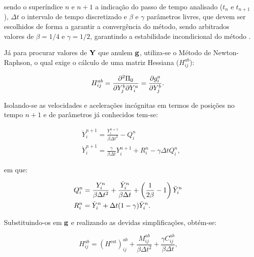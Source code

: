\documentclass[_ArquivoPrincipal.tex]{subfiles}
\begin{document}
\noindent sendo o superíndice $n$ e $n+1$ a indicação do passo de tempo analisado ($t_n$ e $t_{n+1}$), $\Delta t$ o intervalo de tempo discretizado e $\beta$ e $\gamma$ parâmetros livres, que devem ser escolhidos de forma a garantir a convergência do método, sendo arbitrados valores de $\beta=1/4$ e $\gamma=1/2$, garantindo a estabilidade incondicional do método \cite{LINDFIELD2019239}.

Já para procurar valores de $\mathbf{Y}$ que anulem $\mathbf{g}$, utiliza-se o Método de Newton-Raphson, o qual exige o cálculo de uma matriz Hessiana ($H_{ij}^{ab}$):

\begin{equation}
    H_{ij}^{ab}=\frac{\partial^2\Pi_0}{\partial Y_j^b\partial Y_i^a}=\frac{\partial{g_i^a}}{\partial{Y_j^b}}\text{.}
\end{equation}

Isolando-se as velocidades e acelerações incógnitas em termos de posições no tempo $n+1$ e de parâmetros já conhecidos tem-se:

\begin{subequations}
    \begin{align}
         & \ddot{Y}_i^{n+1}=\frac{Y_i^{n+1}}{\beta\Delta t^2}-Q_i^n                                \\
         & \dot{Y}_i^{n+1}=\frac{\gamma}{\beta\Delta t}Y_i^{n+1}+R_i^n-\gamma\Delta tQ_i^n\text{,}
    \end{align}
    \label{eq:CSD-Newmark2}
\end{subequations}

\noindent em que:

\begin{subequations}
    \begin{align}
         & Q_i^n=\frac{Y_i^n}{\beta\Delta t^2}+\frac{\dot{Y}_i^n}{\beta\Delta t}+\left({\frac{1}{2\beta}-1}\right)\ddot{Y}_i^n \\
         & R_i^n=\dot{Y}_i^n+\Delta t(1-\gamma)\ddot{Y}_i^n\text{.}
    \end{align}
    \label{eq:CSD-QnRn}
\end{subequations}

Substituindo-os em $\mathbf{g}$ e realizando as devidas simplificações, obtém-se:

\begin{equation}
    H_{ij}^{ab}=(H^\text{est})_{ij}^{ab}+\frac{M_{ij}^{ab}}{\beta\Delta t^2}+\frac{\gamma C_{ij}^{ab}}{\beta\Delta t}\text{,}
    \label{eq:CSD-Hijab}
\end{equation}
\end{document}
